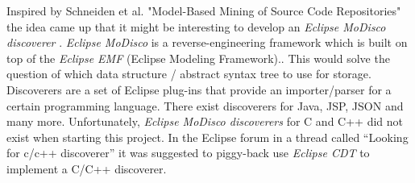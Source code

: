 Inspired by Schneiden et al. "Model-Based Mining of Source Code Repositories"
\cite{scheidgen2014model} the idea came up that it might be interesting to develop
an {\it Eclipse MoDisco discoverer} \cite{Modisco_1}
\cite{bruneliere2010modisco}
\cite{bruneliere2014modisco}.
{\it Eclipse MoDisco} is a reverse-engineering framework which is built on top of the
{\it Eclipse EMF} (Eclipse Modeling Framework)..
This would solve the question of which data structure / abstract syntax tree
to use for storage.
Discoverers are a set of Eclipse plug-ins that provide an importer/parser for a 
certain programming language.
There exist discoverers for Java, JSP, JSON and many more.
Unfortunately, {\it Eclipse MoDisco discoverers} for C and C++ 
did not exist when starting this project.
In the Eclipse forum in a thread called ``Looking for c/c++ discoverer''
\cite{C_Discoverer} it was suggested to piggy-back use {\it Eclipse CDT}
\cite{Eclipse_CDT}\cite{piatov2012using} to implement a C/C++ discoverer.

